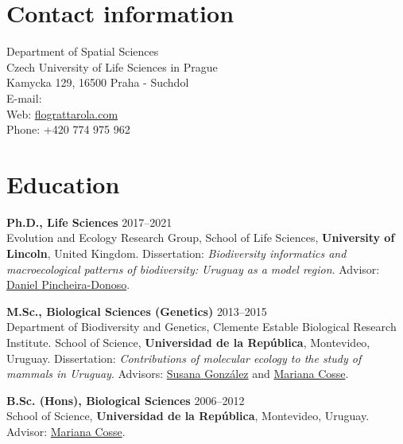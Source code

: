 
\usepackage{wasysym}





\thispagestyle{empty}

\section{Contact information}

	Department of Spatial Sciences \\
	Czech University of Life Sciences in Prague \\
	Kamycka 129, 16500 Praha - Suchdol\\
    	E-mail: \\
    	Web: \href{https://flograttarola.com}{flograttarola.com}\\
    	Phone: +420 774 975 962‬

\HRule

\section{Education}

\begin{innerlist}

\item[]{\bf  Ph.D., Life Sciences}
\hfill {2017--2021} \\
Evolution and Ecology Research Group, School of Life Sciences, {\bf University of Lincoln}, United Kingdom. Dissertation: \textit{Biodiversity informatics and macroecological patterns of biodiversity: Uruguay as a model region}. Advisor: \href{http://selectiondynamics.weebly.com/daniel-pincheira-donoso.html}{Daniel Pincheira-Donoso}.\\

\item[]{\bf  M.Sc., Biological Sciences (Genetics)}
\hfill {2013--2015} \\
Department of Biodiversity and Genetics, Clemente Estable Biological Research Institute. School of Science, {\bf Universidad de la Rep\'{u}blica}, Montevideo, Uruguay. Dissertation: \textit{Contributions of molecular ecology
to the study of mammals in Uruguay}. Advisors: \href{https://scholar.google.com.uy/citations?user=FSrtqaMAAAAJ&hl=en}{Susana González} and \href{https://scholar.google.com/citations?user=uWh1ONQAAAAJ&hl=es}{Mariana Cosse}.\\

\item[]{\bf  B.Sc. (Hons), Biological Sciences}
\hfill {2006--2012} \\
School of Science, {\bf Universidad de la Rep\'{u}blica}, Montevideo, Uruguay. Advisor: \href{https://scholar.google.com/citations?user=uWh1ONQAAAAJ&hl=es}{Mariana Cosse}.\\

\end{innerlist}

